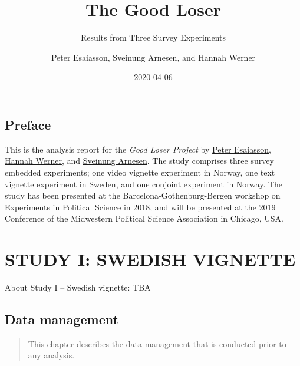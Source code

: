 \documentclass[
]{book}
\title{The Good Loser}
\subtitle{Results from Three Survey Experiments}
\author{Peter Esaiasson, Sveinung Arnesen, and Hannah Werner}
\date{2020-04-06}
\begin{document}
\maketitle

{
\hypersetup{linkcolor=}
\setcounter{tocdepth}{1}
\tableofcontents
}
\hypertarget{preface}{%
\chapter{Preface}\label{preface}}

This is the analysis report for the \emph{Good Loser Project} by \href{https://www.gu.se/omuniversitetet/personal/?userId=xesape}{Peter Esaiasson}, \href{http://www.uva.nl/profiel/w/e/h.i.werner/h.i.werner.html}{Hannah Werner}, and \href{http://frosty-bose-c7f82c.netlify.com/}{Sveinung Arnesen}.
The study comprises three survey embedded experiments; one video vignette experiment in Norway, one text vignette experiment in Sweden, and one conjoint experiment in Norway. The study has been presented at the Barcelona-Gothenburg-Bergen workshop on Experiments in Political Science in 2018, and will be presented at the 2019 Conference of the Midwestern Political Science Association in Chicago, USA.

\hypertarget{part-study-i-swedish-vignette}{%
\part{STUDY I: SWEDISH VIGNETTE}\label{part-study-i-swedish-vignette}}

About Study I -- Swedish vignette: TBA

\hypertarget{data-management}{%
\chapter{Data management}\label{data-management}}

\begin{quote}
This chapter describes the data management that is conducted prior to any analysis.
\end{quote}
\end{document}
